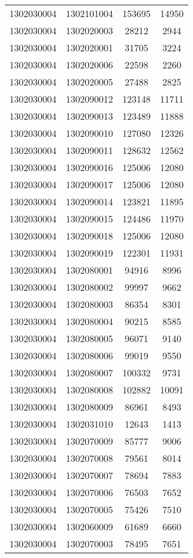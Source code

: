 \begin{longtable}{llcc}
1302030004 & 1302101004 & 153695 & 14950\\
1302030004 & 1302020003 & 28212 & 2944\\
1302030004 & 1302020001 & 31705 & 3224\\
1302030004 & 1302020006 & 22598 & 2260\\
1302030004 & 1302020005 & 27488 & 2825\\
1302030004 & 1302090012 & 123148 & 11711\\
1302030004 & 1302090013 & 123489 & 11888\\
1302030004 & 1302090010 & 127080 & 12326\\
1302030004 & 1302090011 & 128632 & 12562\\
1302030004 & 1302090016 & 125006 & 12080\\
1302030004 & 1302090017 & 125006 & 12080\\
1302030004 & 1302090014 & 123821 & 11895\\
1302030004 & 1302090015 & 124486 & 11970\\
1302030004 & 1302090018 & 125006 & 12080\\
1302030004 & 1302090019 & 122301 & 11931\\
1302030004 & 1302080001 & 94916 & 8996\\
1302030004 & 1302080002 & 99997 & 9662\\
1302030004 & 1302080003 & 86354 & 8301\\
1302030004 & 1302080004 & 90215 & 8585\\
1302030004 & 1302080005 & 96071 & 9140\\
1302030004 & 1302080006 & 99019 & 9550\\
1302030004 & 1302080007 & 100332 & 9731\\
1302030004 & 1302080008 & 102882 & 10091\\
1302030004 & 1302080009 & 86961 & 8493\\
1302030004 & 1302031010 & 12643 & 1413\\
1302030004 & 1302070009 & 85777 & 9006\\
1302030004 & 1302070008 & 79561 & 8014\\
1302030004 & 1302070007 & 78694 & 7883\\
1302030004 & 1302070006 & 76503 & 7652\\
1302030004 & 1302070005 & 75426 & 7510\\
1302030004 & 1302060009 & 61689 & 6660\\
1302030004 & 1302070003 & 78495 & 7651\\

\end{longtable}
